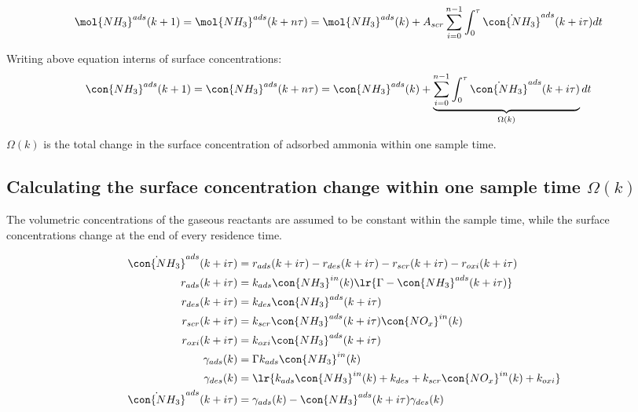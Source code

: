 \begin{align*}
    \mol{NH_3}^{ads}(k + 1) = \mol{NH_3}^{ads} (k + n\tau) &= \mol{NH_3}^{ads} (k) + A_{scr} \sum_{i=0}^{n-1} \int_{0}^{\tau} \dot{\con{NH_3}}^{ads} (k + i\tau) dt
\end{align*}

Writing above equation interns of surface concentrations:
\begin{align*}
    \con{NH_3}^{ads}(k + 1) = \con{NH_3}^{ads} (k + n\tau) &= \con{NH_3}^{ads} (k) + \underbrace{\sum_{i=0}^{n-1} \int_{0}^{\tau} \dot{\con{NH_3}}^{ads} (k + i\tau)}_{\Omega(k)}   dt
\end{align*}

$\Omega(k)$ is the total change in the surface concentration of adsorbed ammonia
within one sample time.

\subsection{Calculating the surface concentration change within one sample time $\Omega(k)$}

The volumetric concentrations of the gaseous reactants are assumed to be
constant within the sample time, while the surface concentrations change at the
end of every residence time.

\begin{align*}
    \dot{\con{NH_3}}^{ads} (k + i\tau) &= r_{ads} (k + i \tau) - r_{des} (k + i \tau) - r_{scr} (k + i \tau) - r_{oxi} (k + i \tau)\\
    r_{ads} (k + i \tau) &= k_{ads} \con{NH_3}^{in}(k) \lr{\Gamma - \con{NH_3}^{ads} (k + i \tau)}\\
    r_{des} (k + i \tau) &= k_{des} \con{NH_3}^{ads}(k + i \tau)\\
    r_{scr} (k + i \tau) &= k_{scr} \con{NH_3}^{ads}(k + i \tau) \con{NO_x}^{in}(k)\\
    r_{oxi} (k + i \tau) &= k_{oxi} \con{NH_3}^{ads}(k + i \tau)\\
    \gamma_{ads} (k) &= \Gamma k_{ads} \con{NH_3}^{in}(k)\\
    \gamma_{des} (k) &= \lr{k_{ads} \con{NH_3}^{in}(k) + k_{des} + k_{scr} \con{NO_x}^{in}(k) + k_{oxi}}\\
    \dot{\con{NH_3}}^{ads} (k + i\tau) &= \gamma_{ads} (k) - \con{NH_3}^{ads} (k + i \tau) \gamma_{des} (k)
\end{align*}

